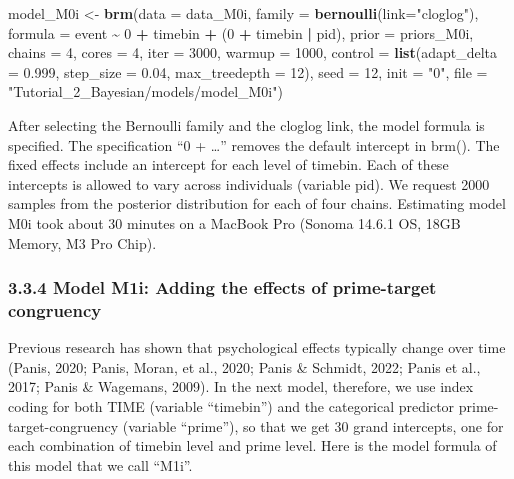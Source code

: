 \documentclass[
  english,
  man, donotrepeattitle,floatsintext]{apa6}
\newenvironment{Shaded}{\begin{snugshade}}{\end{snugshade}}
\newcommand{\AttributeTok}[1]{\textcolor[rgb]{0.13,0.29,0.53}{#1}}
\newcommand{\DecValTok}[1]{\textcolor[rgb]{0.00,0.00,0.81}{#1}}
\newcommand{\FloatTok}[1]{\textcolor[rgb]{0.00,0.00,0.81}{#1}}
\newcommand{\FunctionTok}[1]{\textcolor[rgb]{0.13,0.29,0.53}{\textbf{#1}}}
\newcommand{\NormalTok}[1]{#1}
\newcommand{\OtherTok}[1]{\textcolor[rgb]{0.56,0.35,0.01}{#1}}
\newcommand{\SpecialCharTok}[1]{\textcolor[rgb]{0.81,0.36,0.00}{\textbf{#1}}}
\newcommand{\StringTok}[1]{\textcolor[rgb]{0.31,0.60,0.02}{#1}}
\begin{document}
\begin{Shaded}
\begin{Highlighting}[]
\NormalTok{model\_M0i }\OtherTok{\textless{}{-}}                    
   \FunctionTok{brm}\NormalTok{(}\AttributeTok{data =}\NormalTok{ data\_M0i,}
       \AttributeTok{family =} \FunctionTok{bernoulli}\NormalTok{(}\AttributeTok{link=}\StringTok{"cloglog"}\NormalTok{),}
       \AttributeTok{formula =}\NormalTok{ event }\SpecialCharTok{\textasciitilde{}} \DecValTok{0} \SpecialCharTok{+}\NormalTok{ timebin }\SpecialCharTok{+}\NormalTok{ (}\DecValTok{0} \SpecialCharTok{+}\NormalTok{ timebin }\SpecialCharTok{|}\NormalTok{ pid),}
       \AttributeTok{prior =}\NormalTok{ priors\_M0i,}
       \AttributeTok{chains =} \DecValTok{4}\NormalTok{, }\AttributeTok{cores =} \DecValTok{4}\NormalTok{, }
       \AttributeTok{iter =} \DecValTok{3000}\NormalTok{, }\AttributeTok{warmup =} \DecValTok{1000}\NormalTok{,}
       \AttributeTok{control =} \FunctionTok{list}\NormalTok{(}\AttributeTok{adapt\_delta =} \FloatTok{0.999}\NormalTok{, }
                      \AttributeTok{step\_size =} \FloatTok{0.04}\NormalTok{, }
                      \AttributeTok{max\_treedepth =} \DecValTok{12}\NormalTok{),}
       \AttributeTok{seed =} \DecValTok{12}\NormalTok{, }\AttributeTok{init =} \StringTok{"0"}\NormalTok{,}
       \AttributeTok{file =} \StringTok{"Tutorial\_2\_Bayesian/models/model\_M0i"}\NormalTok{)}
\end{Highlighting}
\end{Shaded}

After selecting the Bernoulli family and the cloglog link, the model formula is specified. The specification ``0 + \ldots{}'' removes the default intercept in brm(). The fixed effects include an intercept for each level of timebin. Each of these intercepts is allowed to vary across individuals (variable pid). We request 2000 samples from the posterior distribution for each of four chains. Estimating model M0i took about 30 minutes on a MacBook Pro (Sonoma 14.6.1 OS, 18GB Memory, M3 Pro Chip).

\subsubsection{3.3.4 Model M1i: Adding the effects of prime-target congruency}\label{model-m1i-adding-the-effects-of-prime-target-congruency}

Previous research has shown that psychological effects typically change over time (Panis, 2020; Panis, Moran, et al., 2020; Panis \& Schmidt, 2022; Panis et al., 2017; Panis \& Wagemans, 2009). In the next model, therefore, we use index coding for both TIME (variable ``timebin'') and the categorical predictor prime-target-congruency (variable ``prime''), so that we get 30 grand intercepts, one for each combination of timebin level and prime level. Here is the model formula of this model that we call ``M1i''.
\end{document}
